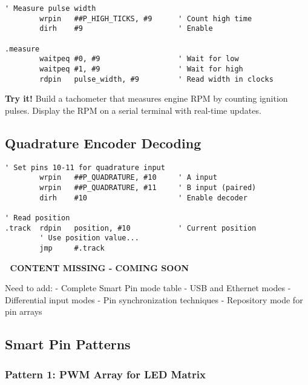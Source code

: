 \documentclass[11pt]{book}
\begin{document}
\begin{lstlisting}
' Measure pulse width
        wrpin   ##P_HIGH_TICKS, #9      ' Count high time
        dirh    #9                      ' Enable
        
.measure
        waitpeq #0, #9                  ' Wait for low
        waitpeq #1, #9                  ' Wait for high
        rdpin   pulse_width, #9         ' Read width in clocks
\end{lstlisting}

\textbf{Try it!} Build a tachometer that measures engine RPM by counting
ignition pulses. Display the RPM on a serial terminal with real-time
updates.

\hypertarget{quadrature-encoder-decoding}{%
\subsection{Quadrature Encoder
Decoding}\label{quadrature-encoder-decoding}}

\begin{lstlisting}
' Set pins 10-11 for quadrature input
        wrpin   ##P_QUADRATURE, #10     ' A input
        wrpin   ##P_QUADRATURE, #11     ' B input (paired)
        dirh    #10                     ' Enable decoder
        
' Read position
.track  rdpin   position, #10           ' Current position
        ' Use position value...
        jmp     #.track
\end{lstlisting}

\begin{missing}
🚧 \textbf{CONTENT MISSING - COMING SOON}

Need to add:
- Complete Smart Pin mode table
- USB and Ethernet modes
- Differential input modes
- Pin synchronization techniques
- Repository mode for pin arrays
\end{missing}

\hypertarget{smart-pin-patterns}{%
\subsection{Smart Pin Patterns}\label{smart-pin-patterns}}

\hypertarget{pattern-1-pwm-array-for-led-matrix}{%
\subsubsection{Pattern 1: PWM Array for LED
Matrix}\label{pattern-1-pwm-array-for-led-matrix}}
\end{document}
